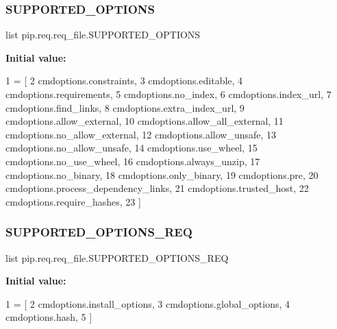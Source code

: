 \subsubsection{\texorpdfstring{S\+U\+P\+P\+O\+R\+T\+E\+D\+\_\+\+O\+P\+T\+I\+O\+NS}{SUPPORTED\_OPTIONS}}
{\footnotesize\ttfamily list pip.\+req.\+req\+\_\+file.\+S\+U\+P\+P\+O\+R\+T\+E\+D\+\_\+\+O\+P\+T\+I\+O\+NS}

{\bfseries Initial value\+:}
\begin{DoxyCode}
1 =  [
2     cmdoptions.constraints,
3     cmdoptions.editable,
4     cmdoptions.requirements,
5     cmdoptions.no\_index,
6     cmdoptions.index\_url,
7     cmdoptions.find\_links,
8     cmdoptions.extra\_index\_url,
9     cmdoptions.allow\_external,
10     cmdoptions.allow\_all\_external,
11     cmdoptions.no\_allow\_external,
12     cmdoptions.allow\_unsafe,
13     cmdoptions.no\_allow\_unsafe,
14     cmdoptions.use\_wheel,
15     cmdoptions.no\_use\_wheel,
16     cmdoptions.always\_unzip,
17     cmdoptions.no\_binary,
18     cmdoptions.only\_binary,
19     cmdoptions.pre,
20     cmdoptions.process\_dependency\_links,
21     cmdoptions.trusted\_host,
22     cmdoptions.require\_hashes,
23 ]
\end{DoxyCode}
\mbox{\label{namespacepip_1_1req_1_1req__file_a59cbebe3bb8cd0fb74d0bb5804e04403}} 
\subsubsection{\texorpdfstring{S\+U\+P\+P\+O\+R\+T\+E\+D\+\_\+\+O\+P\+T\+I\+O\+N\+S\+\_\+\+R\+EQ}{SUPPORTED\_OPTIONS\_REQ}}
{\footnotesize\ttfamily list pip.\+req.\+req\+\_\+file.\+S\+U\+P\+P\+O\+R\+T\+E\+D\+\_\+\+O\+P\+T\+I\+O\+N\+S\+\_\+\+R\+EQ}

{\bfseries Initial value\+:}
\begin{DoxyCode}
1 =  [
2     cmdoptions.install\_options,
3     cmdoptions.global\_options,
4     cmdoptions.hash,
5 ]
\end{DoxyCode}
